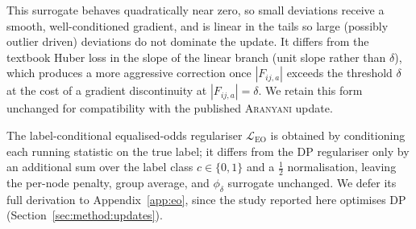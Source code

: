 \documentclass[sigconf,anonymous,review]{acmart}
\begin{document}
This surrogate behaves quadratically near zero, so small deviations receive a smooth, well-conditioned gradient, and is linear in the tails so large (possibly
outlier driven) deviations do not dominate the update. It differs from the textbook Huber loss in the slope of the linear branch (unit slope rather than $\delta$),
which produces a more aggressive correction once $|F_{ij,a}|$ exceeds the threshold $\delta$ at the cost of a gradient discontinuity at $|F_{ij,a}| = \delta$. We retain
this form unchanged for compatibility with the published \textsc{Aranyani} update.

The label-conditional equalised-odds regulariser $\mathcal{L}_{\mathrm{EO}}$ is obtained by conditioning each running statistic on the true label; it differs from the
DP regulariser only by an additional sum over the label class $c\in\{0,1\}$ and a $\tfrac{1}{2}$ normalisation, leaving the per-node penalty, group average, and $\phi_\delta$
surrogate unchanged. We defer its full derivation to Appendix~\ref{app:eo}, since the study reported here optimises DP (Section~\ref{sec:method:updates}).
\end{document}
